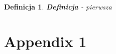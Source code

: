 \documentclass[twoside]{iisthesis}
\newtheorem{mydef}{Definicja}
\begin{document}
\begin{mydef}
\textbf{Definicja} - pierwsza
\end{mydef}



\clearpage
\appendix
\chapter{Appendix 1}


\clearpage
\pagestyle{plain}
\listofmyfigure
\listofmyequations
\listofmyalgorithm
\clearpage





\end{document}
